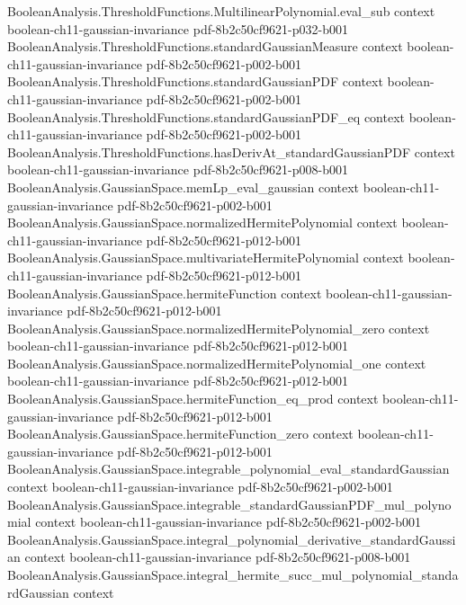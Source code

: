 \begin{lemma}
\proofstep
  {BooleanAnalysis.ThresholdFunctions.MultilinearPolynomial.eval_sub}
  {context}
  {boolean-ch11-gaussian-invariance}
  {pdf-8b2c50cf9621-p032-b001}
\proofstep
  {BooleanAnalysis.ThresholdFunctions.standardGaussianMeasure}
  {context}
  {boolean-ch11-gaussian-invariance}
  {pdf-8b2c50cf9621-p002-b001}
\proofstep
  {BooleanAnalysis.ThresholdFunctions.standardGaussianPDF}
  {context}
  {boolean-ch11-gaussian-invariance}
  {pdf-8b2c50cf9621-p002-b001}
\proofstep
  {BooleanAnalysis.ThresholdFunctions.standardGaussianPDF_eq}
  {context}
  {boolean-ch11-gaussian-invariance}
  {pdf-8b2c50cf9621-p002-b001}
\proofstep
  {BooleanAnalysis.ThresholdFunctions.hasDerivAt_standardGaussianPDF}
  {context}
  {boolean-ch11-gaussian-invariance}
  {pdf-8b2c50cf9621-p008-b001}
\proofstep
  {BooleanAnalysis.GaussianSpace.memLp_eval_gaussian}
  {context}
  {boolean-ch11-gaussian-invariance}
  {pdf-8b2c50cf9621-p002-b001}
\proofstep
  {BooleanAnalysis.GaussianSpace.normalizedHermitePolynomial}
  {context}
  {boolean-ch11-gaussian-invariance}
  {pdf-8b2c50cf9621-p012-b001}
\proofstep
  {BooleanAnalysis.GaussianSpace.multivariateHermitePolynomial}
  {context}
  {boolean-ch11-gaussian-invariance}
  {pdf-8b2c50cf9621-p012-b001}
\proofstep
  {BooleanAnalysis.GaussianSpace.hermiteFunction}
  {context}
  {boolean-ch11-gaussian-invariance}
  {pdf-8b2c50cf9621-p012-b001}
\proofstep
  {BooleanAnalysis.GaussianSpace.normalizedHermitePolynomial_zero}
  {context}
  {boolean-ch11-gaussian-invariance}
  {pdf-8b2c50cf9621-p012-b001}
\proofstep
  {BooleanAnalysis.GaussianSpace.normalizedHermitePolynomial_one}
  {context}
  {boolean-ch11-gaussian-invariance}
  {pdf-8b2c50cf9621-p012-b001}
\proofstep
  {BooleanAnalysis.GaussianSpace.hermiteFunction_eq_prod}
  {context}
  {boolean-ch11-gaussian-invariance}
  {pdf-8b2c50cf9621-p012-b001}
\proofstep
  {BooleanAnalysis.GaussianSpace.hermiteFunction_zero}
  {context}
  {boolean-ch11-gaussian-invariance}
  {pdf-8b2c50cf9621-p012-b001}
\proofstep
  {BooleanAnalysis.GaussianSpace.integrable_polynomial_eval_standardGaussian}
  {context}
  {boolean-ch11-gaussian-invariance}
  {pdf-8b2c50cf9621-p002-b001}
\proofstep
  {BooleanAnalysis.GaussianSpace.integrable_standardGaussianPDF_mul_polynomial}
  {context}
  {boolean-ch11-gaussian-invariance}
  {pdf-8b2c50cf9621-p002-b001}
\proofstep
  {BooleanAnalysis.GaussianSpace.integral_polynomial_derivative_standardGaussian}
  {context}
  {boolean-ch11-gaussian-invariance}
  {pdf-8b2c50cf9621-p008-b001}
\proofstep
  {BooleanAnalysis.GaussianSpace.integral_hermite_succ_mul_polynomial_standardGaussian}
  {context}

\end{lemma}
